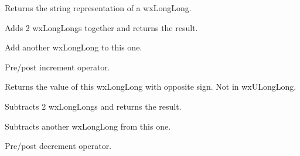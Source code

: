 
Returns the string representation of a wxLongLong.


\label{wxlonglongoperatorplus}


Adds 2 wxLongLongs together and returns the result.


\label{wxlonglongoperatorplusassign}


Add another wxLongLong to this one.


\label{wxlonglongoperatorinc}



Pre/post increment operator.


\label{wxlonglongoperatorunaryminus}


Returns the value of this wxLongLong with opposite sign.  Not in wxULongLong.


\label{wxlonglongoperatorminus}


Subtracts 2 wxLongLongs and returns the result.


\label{wxlonglongoperatorminusassign}


Subtracts another wxLongLong from this one.


\label{wxlonglongoperatordec}



Pre/post decrement operator.


